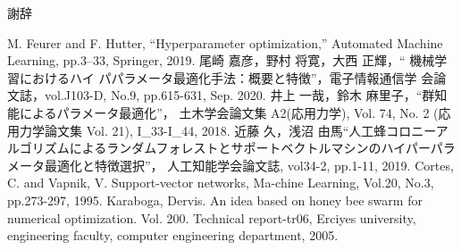 \documentclass[12pt, dvipdfmx]{jarticle}
\numberwithin{equation}{section}
\begin{document}

\tableofcontents %
\clearpage %

\clearpage %
\clearpage
\clearpage
\clearpage
\clearpage
\clearpage

\clearpage
\clearpage

謝辞 %
\clearpage

\begin{thebibliography}{99} %
M. Feurer and F. Hutter, “Hyperparameter optimization,” Automated Machine Learning, pp.3–33, Springer, 2019.
尾崎 嘉彦，野村 将寛，大西 正輝，“ 機械学習におけるハイ
パパラメータ最適化手法：概要と特徴”，電子情報通信学
会論文誌，vol.J103-D, No.9, pp.615-631, Sep. 2020.
井上 一哉，鈴木 麻里子，“群知能によるパラメータ最適化”，
土木学会論文集 A2(応用力学), Vol. 74, No. 2 (応用力学論文集 Vol. 21), I\_33-I\_44, 2018.
近藤 久，浅沼 由馬“人工蜂コロニーアルゴリズムによるランダムフォレストとサポートベクトルマシンのハイパーパラメータ最適化と特徴選択”，
人工知能学会論文誌, vol34-2, pp.1-11, 2019.
Cortes, C. and Vapnik, V. Support-vector networks, Ma-chine Learning, Vol.20, No.3, pp.273-297, 1995.
Karaboga, Dervis. An idea based on honey bee swarm for numerical optimization. Vol. 200. 
Technical report-tr06, Erciyes university, engineering faculty, computer engineering department, 2005.
\end{thebibliography} %
\end{document}
